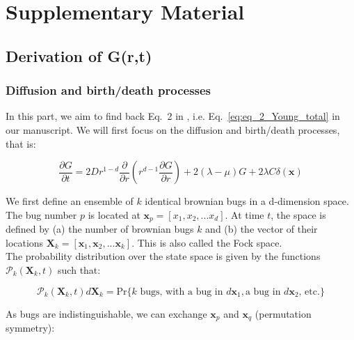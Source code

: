 \section*{Supplementary Material}

\subsection*{Derivation of G(r,t)}

\subsubsection*{Diffusion and birth/death processes}

In this part, we aim to find back Eq.~2 in \cite{young_reproductive_2001}, i.e. Eq.~\ref{eq:eq_2_Young_total} in our manuscript. We will first focus on the diffusion and birth/death processes, that is:

\begin{equation}
 \frac{\partial G}{\partial t}=2Dr^{1-d}\frac{\partial}{\partial r}\left(r^{d-1}\frac{\partial G}{\partial r}\right)+2(\lambda-\mu)G+2\lambda C\delta(\boldsymbol{x})\label{eq:eq_2_Young_diffusionbirth}
\end{equation}

\vspace{1.25em}

We first define an ensemble of $k$ identical brownian bugs in a d-dimension
space. The
bug number $p$ is located at $\boldsymbol{x}_{p}=[x_1,x_2,...x_{d}]$.
At time $t$, the space is defined by (a) the number of brownian
bugs $k$ and (b) the vector of their locations $\boldsymbol{X}_{k}=[\boldsymbol{x}_{1},\boldsymbol{x}_{2},...\boldsymbol{x}_{k}]$.
This is also called the Fock space. \\

The probability distribution over
the state space is given by the functions $\mathcal{P}_{k}(\boldsymbol{X}_{k},t)$
such that:

\begin{equation}
\mathcal{P}_{k}(\boldsymbol{X}_{k},t)d\boldsymbol{X}_{k}=\text{Pr}\{k\text{ bugs, with a bug in }d\boldsymbol{x}_{1},\text{a bug in }d\boldsymbol{x}_{2}\text{, etc.}\}
\end{equation}

\vspace{1.25em}

As bugs are indistinguishable, we can exchange $\boldsymbol{x}_{p}$
and $\boldsymbol{x}_{q}$ (permutation symmetry):

